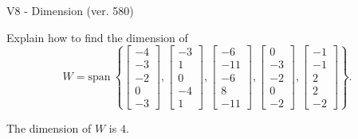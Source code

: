 \begin{exercise}
  \begin{exerciseTitle}V8 - Dimension (ver. 580)\end{exerciseTitle}
  \begin{exerciseStatement}
    Explain how to find the dimension of 
\[W=\mathrm{span}\ \left\{\left[\begin{array}{r}
-4 \\
-3 \\
-2 \\
0 \\
-3
\end{array}\right] , \left[\begin{array}{r}
-3 \\
1 \\
0 \\
-4 \\
1
\end{array}\right] , \left[\begin{array}{r}
-6 \\
-11 \\
-6 \\
8 \\
-11
\end{array}\right] , \left[\begin{array}{r}
0 \\
-3 \\
-2 \\
0 \\
-2
\end{array}\right] , \left[\begin{array}{r}
-1 \\
-1 \\
2 \\
2 \\
-2
\end{array}\right]\right\}.\]



  \end{exerciseStatement}
  \begin{exerciseAnswer}
   The dimension of \(W\) is  \(4\).
  


  \end{exerciseAnswer}
\end{exercise}
